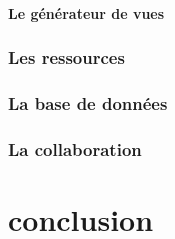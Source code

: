 \documentclass[a4paper,11pt]{report}
\begin{document}
\subsubsection{Le générateur de vues}

\subsection{Les ressources}


\subsection{La base de données}

\subsection{La collaboration}


\chapter{conclusion}
\end{document}
